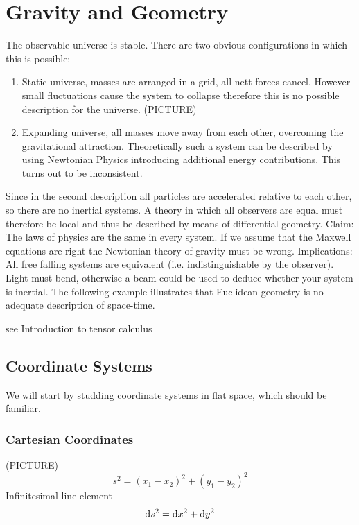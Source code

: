 \chapter{Gravity and Geometry}
The observable universe is stable. There are two obvious configurations in which this is possible:
\begin{enumerate}
    \item Static universe, masses are arranged in a grid, all nett forces cancel. 
    	  However small fluctuations cause the system to collapse therefore this is
    	  no possible description for the universe. (PICTURE)
    \item Expanding universe, all masses move away from each other, overcoming the gravitational attraction. 
    	  Theoretically such a system can be described by using Newtonian Physics introducing additional energy contributions. 
    	  This turns out to be inconsistent.
\end{enumerate}
Since in the second description all particles are accelerated relative to each other, so there are no inertial systems. 
A theory in which all observers are equal must therefore be local and thus be described by means of differential geometry.
Claim: The laws of physics are the same in every system.
If we assume that the Maxwell equations are right the Newtonian theory of gravity must be wrong.
Implications:
All free falling systems are equivalent (i.e. indistinguishable by the observer). 
Light must bend, otherwise a beam could be used to deduce whether your system is inertial.
The following example illustrates that Euclidean geometry is no adequate description of space-time.
\begin{example}
see Introduction to tensor calculus
\end{example}
\section{Coordinate Systems}
We will start by studding coordinate systems in flat space, which should be familiar.
\subsection*{Cartesian Coordinates}
(PICTURE)
\begin{equation}
    s^2=(x_1-x_2)^2+(y_1-y_2)^2
\end{equation}
Infinitesimal line element
\begin{equation}
    \dif s^2=\dif x^2+\dif y^2  \label{eq:cartline}
\end{equation}

